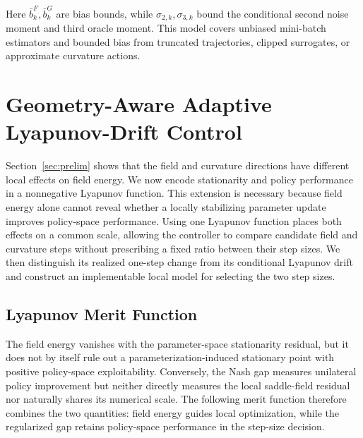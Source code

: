 \documentclass{article}
\theoremstyle{remark}
\begin{document}
Here $\bar b_k^F,\bar b_k^G$ are bias bounds, while $\sigma_{2,k},\sigma_{3,k}$ bound the conditional second noise moment and third oracle moment.
This model covers unbiased mini-batch estimators and bounded bias from truncated trajectories, clipped surrogates, or approximate curvature actions.

\section{Geometry-Aware Adaptive Lyapunov-Drift Control}\label{sec:drift}
Section~\ref{sec:prelim} shows that the field and curvature directions have different local effects on field energy.
We now encode stationarity and policy performance in a nonnegative Lyapunov function.
This extension is necessary because field energy alone cannot reveal whether a locally stabilizing parameter update improves policy-space performance.
Using one Lyapunov function places both effects on a common scale, allowing the controller to compare candidate field and curvature steps without prescribing a fixed ratio between their step sizes.
We then distinguish its realized one-step change from its conditional Lyapunov drift and construct an implementable local model for selecting the two step sizes.

\subsection{Lyapunov Merit Function}\label{subsec:V_drift}
The field energy vanishes with the parameter-space stationarity residual, but it does not by itself rule out a parameterization-induced stationary point with positive policy-space exploitability.
Conversely, the Nash gap measures unilateral policy improvement but neither directly measures the local saddle-field residual nor naturally shares its numerical scale.
The following merit function therefore combines the two quantities: field energy guides local optimization, while the regularized gap retains policy-space performance in the step-size decision.
\end{document}
